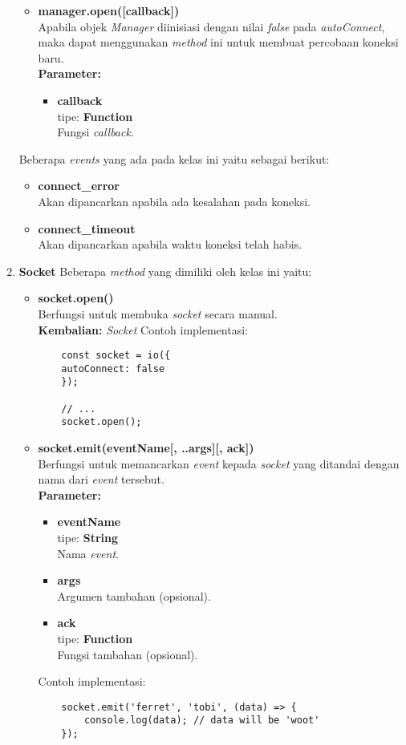 \begin{enumerate}
\begin{itemize}
		\item \textbf{manager.open([callback])} \\
		Apabila objek \textit{Manager} diinisiasi dengan nilai \textit{false} pada \textit{autoConnect}, maka dapat menggunakan \textit{method} ini untuk membuat percobaan koneksi baru.\\
		\textbf{Parameter:}
		\begin{itemize}
			\item \textbf{callback} \\tipe: \textbf{Function} \\ Fungsi \textit{callback}.
		\end{itemize}
	\end{itemize}

	Beberapa \textit{events} yang ada pada kelas ini yaitu sebagai berikut:
	\begin{itemize}
		\item \textbf{connect\_error} \\ Akan dipancarkan apabila ada kesalahan pada koneksi.
		\item \textbf{connect\_timeout} \\ Akan dipancarkan apabila waktu koneksi telah habis.
	\end{itemize}
	
	\item \textbf{Socket}
	Beberapa \textit{method} yang dimiliki oleh kelas ini yaitu:
	\begin{itemize}
		\item \textbf{socket.open()} \\ Berfungsi untuk membuka \textit{socket} secara manual.\\
		\textbf{Kembalian:} \textit{Socket}
		Contoh implementasi:
	\begin{lstlisting}
	const socket = io({
	autoConnect: false
	});
	
	// ...
	socket.open();
	\end{lstlisting}
	
	\item \textbf{socket.emit(eventName[, ..args][, ack])} \\ 
	Berfungsi untuk memancarkan \textit{event} kepada \textit{socket} yang ditandai dengan nama dari \textit{event} tersebut.\\ 
	\textbf{Parameter:}
	\begin{itemize}
		\item \textbf{eventName} \\tipe: \textbf{String} \\ Nama \textit{event}.
		\item \textbf{args} \\ Argumen tambahan (opsional).
		\item \textbf{ack} \\tipe: \textbf{Function} \\ Fungsi tambahan (opsional).
	\end{itemize}
	Contoh implementasi:
	\begin{lstlisting}
	socket.emit('ferret', 'tobi', (data) => {
		console.log(data); // data will be 'woot'
	});
	\end{lstlisting}
	

\end{itemize}
\end{enumerate}
